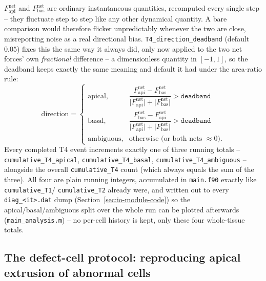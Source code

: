 \documentclass[11pt,a4paper]{report}
\begin{document}
\begin{physbox}
$F^{\mathrm{net}}_{\mathrm{api}}$ and $F^{\mathrm{net}}_{\mathrm{bas}}$
are ordinary instantaneous quantities, recomputed every single step --
they fluctuate step to step like any other dynamical quantity. A bare
comparison would therefore flicker unpredictably whenever the two are
close, misreporting noise as a real directional bias.
\texttt{T4\_direction\_deadband} (default $0.05$) fixes this the same
way it always did, only now applied to the two net forces' own
\emph{fractional} difference -- a dimensionless quantity in $[-1,1]$,
so the deadband keeps exactly the same meaning and default it had
under the area-ratio rule:
\begin{equation}
  \text{direction} =
  \begin{cases}
    \text{apical}, & \dfrac{F^{\mathrm{net}}_{\mathrm{api}} - F^{\mathrm{net}}_{\mathrm{bas}}}
                          {\lvert F^{\mathrm{net}}_{\mathrm{api}}\rvert + \lvert F^{\mathrm{net}}_{\mathrm{bas}}\rvert}
                          > \texttt{deadband} \\[1.2ex]
    \text{basal}, & \dfrac{F^{\mathrm{net}}_{\mathrm{bas}} - F^{\mathrm{net}}_{\mathrm{api}}}
                          {\lvert F^{\mathrm{net}}_{\mathrm{api}}\rvert + \lvert F^{\mathrm{net}}_{\mathrm{bas}}\rvert}
                          > \texttt{deadband} \\[1.2ex]
    \text{ambiguous}, & \text{otherwise (or both nets $\approx 0$).}
  \end{cases}
\end{equation}
Every completed T4 event increments exactly one of three running
totals -- \texttt{cumulative\_T4\_apical}, \texttt{cumulative\_T4\_basal},
\texttt{cumulative\_T4\_ambiguous} -- alongside the overall
\texttt{cumulative\_T4} count (which always equals the sum of the
three). All four are plain running integers, accumulated in
\texttt{main.f90} exactly like \texttt{cumulative\_T1}/
\texttt{cumulative\_T2} already were, and written out to every
\texttt{diag\_<it>.dat} dump (Section~\ref{sec:io-module-code}) so the
apical/basal/ambiguous split over the whole run can be plotted
afterwards (\texttt{main\_analysis.m}) -- no per-cell history is kept,
only these four whole-tissue totals.
\end{physbox}

\subsection{The defect-cell protocol: reproducing apical extrusion of abnormal cells}
\label{sec:defect}
\end{document}
